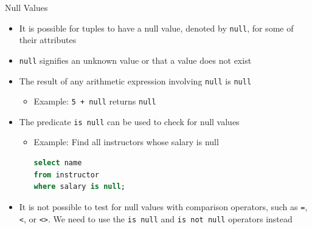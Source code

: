 \documentclass[aspectratio=169, xcolor=dvipsnames]{beamer}
\begin{document}
\begin{frame}[fragile]{Null Values}
    \begin{itemize}
        \item It is possible for tuples to have a null value, denoted by \texttt{null}, for some of their attributes
        \item \texttt{null} signifies an unknown value or that a value does not exist
        \item The result of any arithmetic expression involving \texttt{null} is \texttt{null}
        \begin{itemize}
            \item Example: \texttt{5 + null} returns \texttt{null}
        \end{itemize}
        \item The predicate \texttt{is null} can be used to check for null values
        \begin{itemize}
            \item Example: Find all instructors whose salary is null
            \begin{lstlisting}[language=SQL]
select name 
from instructor 
where salary is null;
            \end{lstlisting}
        \end{itemize}
        \item It is not possible to test for null values with comparison operators, such as \texttt{=}, \texttt{<}, or \texttt{<>}. We need to use the \texttt{is null} and \texttt{is not null} operators instead
    \end{itemize}
\end{frame}
\end{document}
